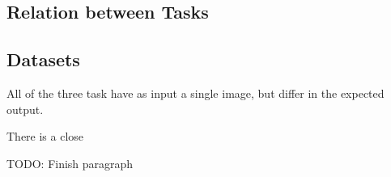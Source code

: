 \subsection{Relation between Tasks}

\subsection{Datasets}


All of the three task have as input a single image, but differ in the expected output.


There is  a close 

TODO: Finish paragraph

